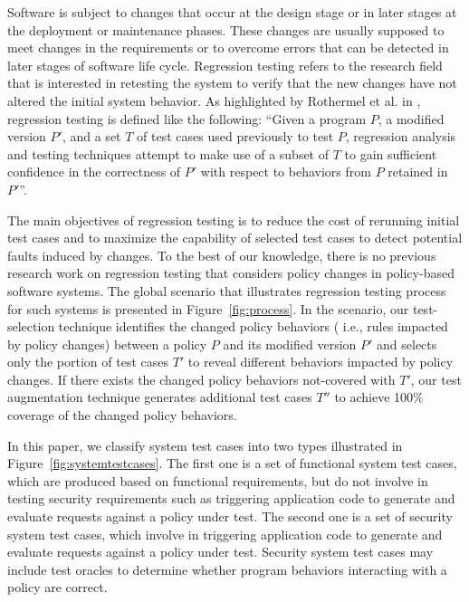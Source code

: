 Software is subject to changes that occur at the design stage or in later stages at the deployment or maintenance phases. These changes are 
usually supposed to meet changes in the requirements or to overcome errors that can be detected in later stages of software life cycle. 
Regression testing refers to the research field that is interested in retesting the system to verify that the new changes have not altered 
the initial system behavior. As highlighted by Rothermel et al. in \cite{Rothermel:1996:ART:235681.235682}, regression testing is defined like the 
following: 
``Given a program $P$, a modified version $P'$, and a set $T$ of test cases used previously to test $P$, regression analysis and testing 
techniques attempt to make use of a subset of $T$ to gain sufficient confidence in the correctness of $P'$ with respect to behaviors from $P$ retained 
in $P'$''.

The main objectives of regression testing is to reduce the cost of rerunning initial test cases and to maximize the capability of 
selected test cases to detect potential faults induced by changes.
To the best of our knowledge, there is no previous research work on regression testing that considers policy changes in policy-based software systems. 
The global scenario that illustrates regression testing process for such systems is presented in Figure~\ref{fig:process}.
In the scenario, our test-selection technique identifies the changed policy behaviors (
i.e., rules impacted by policy changes)
 between a policy $P$ and its modified version $P'$ and selects only the portion of test cases $T'$ to reveal different behaviors
impacted by policy changes. If there exists the changed policy behaviors not-covered with $T'$, our test augmentation technique generates additional test cases $T''$  to achieve 100\% coverage of the changed policy behaviors.

In this paper, we classify system test cases into two types illustrated in Figure~\ref{fig:systemtestcases}.
The first one is a set of functional system test cases, which
are produced based on functional requirements, but do not involve
in testing security requirements such as triggering application code to generate
and evaluate requests against a policy under test.
The second one is a set of security system test cases, which
involve in triggering application code to generate
and evaluate requests against a policy under test.
Security system test cases may include test oracles
to determine whether program behaviors interacting with a policy
are correct.



